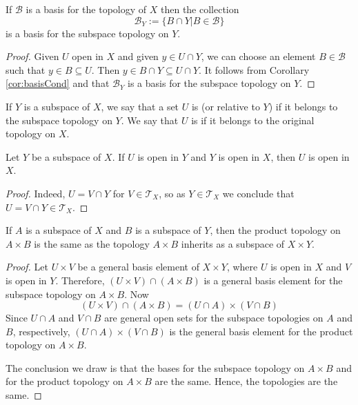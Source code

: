 \documentclass[12pt, a4paper, oneside, openright, titlepage]{book}
\begin{document}
\begin{lem}
    If $\mathcal{B}$ is a basis for the topology of $X$ then the collection \begin{equation*}
        \mathcal{B}_Y := \{B\cap Y\vert B \in \mathcal{B}\}
    \end{equation*}
    is a basis for the subspace topology on $Y$.
\end{lem}
\begin{proof}
    Given $U$ open in $X$ and given $y \in U\cap Y$, we can choose an element $B \in \mathcal{B}$ such that $y \in B\subseteq U$. Then $y \in B\cap Y \subseteq U\cap Y$. It follows from Corollary \ref{cor:basisCond} and that $\mathcal{B}_Y$ is a basis for the subspace topology on $Y$. 
\end{proof}


\begin{defn}
    If $Y$ is a subspace of $X$, we say that a set $U$ is  (or relative to $Y$) if it belongs to the subspace topology on $Y$. We say that $U$ is  if it belongs to the original topology on $X$.
\end{defn}


\begin{lem}
    Let $Y$ be a subspace of $X$. If $U$ is open in $Y$ and $Y$ is open in $X$, then $U$ is open in $X$.
\end{lem}
\begin{proof}
    Indeed, $U = V\cap Y$ for $V \in \mathcal{T}_X$, so as $Y \in \mathcal{T}_X$ we conclude that $U = V\cap Y \in \mathcal{T}_X$.
\end{proof}

\begin{thm}
    If $A$ is a subspace of $X$ and $B$ is a subspace of $Y$, then the product topology on $A\times B$ is the same as the topology $A\times B$ inherits as a subspace of $X\times Y$.
\end{thm}
\begin{proof}
    Let $U\times V$ be a general basis element of $X\times Y$, where $U$ is open in $X$ and $V$ is open in $Y$. Therefore, $(U\times V)\cap(A\times B)$ is a general basis element for the subspace topology on $A\times B$. Now \begin{equation*}
        (U\times V)\cap (A\times B) = (U\cap A)\times (V\cap B)
    \end{equation*}
    Since $U\cap A$ and $V\cap B$ are general open sets for the subspace topologies on $A$ and $B$, respectively, $(U\cap A)\times (V\cap B)$ is the general basis element for the product topology on $A\times B$.

    The conclusion we draw is that the bases for the subspace topology on $A\times B$ and for the product topology on $A\times B$ are the same. Hence, the topologies are the same.
\end{proof}
\end{document}
